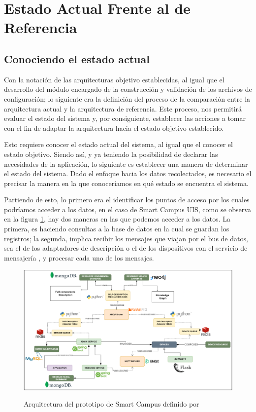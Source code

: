 \section{Estado Actual Frente al de Referencia}

\subsection{Conociendo el estado actual}

Con la notación de las arquitecturas objetivo establecidas, al igual que el desarrollo del módulo encargado de la construcción y validación de los archivos de configuración; lo siguiente era la definición del proceso de la comparación entre la arquitectura actual y la arquitectura de referencia. Este proceso, nos permitirá evaluar el estado del sistema y, por consiguiente, establecer las acciones a tomar con el fin de adaptar la arquitectura hacia el estado objetivo establecido.

Esto requiere conocer el estado actual del sistema, al igual que el conocer el estado objetivo. Siendo así, y ya teniendo la posibilidad de declarar las necesidades de la aplicación, lo siguiente es establecer una manera de determinar el estado del sistema. Dado el enfoque hacia los datos recolectados, es necesario el precisar la manera en la que conoceríamos en qué estado se encuentra el sistema.

Partiendo de esto, lo primero era el identificar los puntos de acceso por los cuales podríamos acceder a los datos, en el caso de Smart Campus UIS, como se observa en la figura \ref{fig:ArquitecturaSmartCampus}, hay dos maneras en las que podemos acceder a los datos. La primera, es haciendo consultas a la base de datos en la cual se guardan los registros; la segunda, implica recibir los mensajes que viajan por el bus de datos, sea el de los adaptadores de descripción o el de los dispositivos con el servicio de mensajería , y procesar cada uno de los mensajes.

\begin{figure}[H]
    \centering
    \caption{Arquitectura del prototipo de Smart Campus definido por }
    \includegraphics[width=\linewidth]{images/ArquitecturaSmartCampus.png}
    \label{fig:ArquitecturaSmartCampus}
\end{figure}


